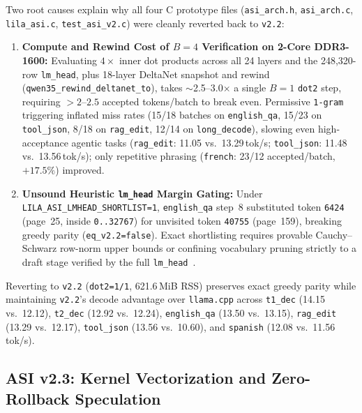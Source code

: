 \documentclass[11pt,a4paper]{article}
\begin{document}
Two root causes explain why all four C prototype files (\texttt{asi\_arch.h}, \texttt{asi\_arch.c}, \texttt{lila\_asi.c}, \texttt{test\_asi\_v2.c}) were cleanly reverted back to \texttt{v2.2}:
\begin{enumerate}
    \item \textbf{Compute and Rewind Cost of $B=4$ Verification on 2-Core DDR3-1600:} Evaluating $4\times$ inner dot products across all 24 layers and the 248,320-row \texttt{lm\_head}, plus 18-layer DeltaNet snapshot and rewind (\texttt{qwen35\_rewind\_deltanet\_to}), takes $\sim$2.5--3.0$\times$ a single $B=1$ \texttt{dot2} step, requiring $>2\text{--}2.5$ accepted tokens/batch to break even. Permissive \texttt{1-gram} triggering inflated miss rates (15/18 batches on \texttt{english\_qa}, 15/23 on \texttt{tool\_json}, 8/18 on \texttt{rag\_edit}, 12/14 on \texttt{long\_decode}), slowing even high-acceptance agentic tasks (\texttt{rag\_edit}: 11.05 vs.\ 13.29\,tok/s; \texttt{tool\_json}: 11.48 vs.\ 13.56\,tok/s); only repetitive phrasing (\texttt{french}: 23/12 accepted/batch, $+17.5\%$) improved.
    \item \textbf{Unsound Heuristic \texttt{lm\_head} Margin Gating:} Under \texttt{LILA\_ASI\_LMHEAD\_SHORTLIST=1}, \texttt{english\_qa} step~8 substituted token \texttt{6424} (page~25, inside \texttt{0..32767}) for unvisited token \texttt{40755} (page~159), breaking greedy parity (\texttt{eq\_v2.2=false}). Exact shortlisting requires provable Cauchy--Schwarz row-norm upper bounds or confining vocabulary pruning strictly to a draft stage verified by the full \texttt{lm\_head}~\cite{zhao2025}.
\end{enumerate}
Reverting to \texttt{v2.2} (\texttt{dot2=1/1}, 621.6\,MiB RSS) preserves exact greedy parity while maintaining \texttt{v2.2}'s decode advantage over \texttt{llama.cpp} across \texttt{t1\_dec} (14.15 vs.\ 12.12), \texttt{t2\_dec} (12.92 vs.\ 12.24), \texttt{english\_qa} (13.50 vs.\ 13.15), \texttt{rag\_edit} (13.29 vs.\ 12.17), \texttt{tool\_json} (13.56 vs.\ 10.60), and \texttt{spanish} (12.08 vs.\ 11.56\,tok/s).

\subsection{ASI v2.3: Kernel Vectorization and Zero-Rollback Speculation}
\label{subsec:v23_trial12}
\end{document}
